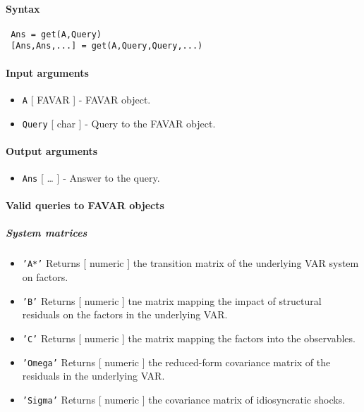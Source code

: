 


	\paragraph{Syntax}
 
 \begin{verbatim}
 Ans = get(A,Query)
 [Ans,Ans,...] = get(A,Query,Query,...)
 \end{verbatim}
 
 \paragraph{Input arguments}
 
 \begin{itemize}
 \item
   \texttt{A} {[} FAVAR {]} - FAVAR object.
 \item
   \texttt{Query} {[} char {]} - Query to the FAVAR object.
 \end{itemize}
 
 \paragraph{Output arguments}
 
 \begin{itemize}
 \item
   \texttt{Ans} {[} \ldots{} {]} - Answer to the query.
 \end{itemize}
 
 \paragraph{Valid queries to FAVAR objects}
 
 \subparagraph{System matrices}
 
 \begin{itemize}
 \item
   \texttt{'A*'} Returns {[} numeric {]} the transition matrix of the
   underlying VAR system on factors.
 \item
   \texttt{'B'} Returns {[} numeric {]} tne matrix mapping the impact of
   structural residuals on the factors in the underlying VAR.
 \item
   \texttt{'C'} Returns {[} numeric {]} the matrix mapping the factors
   into the observables.
 \item
   \texttt{'Omega'} Returns {[} numeric {]} the reduced-form covariance
   matrix of the residuals in the underlying VAR.
 \item
   \texttt{'Sigma'} Returns {[} numeric {]} the covariance matrix of
   idiosyncratic shocks.
 \end{itemize}
 

